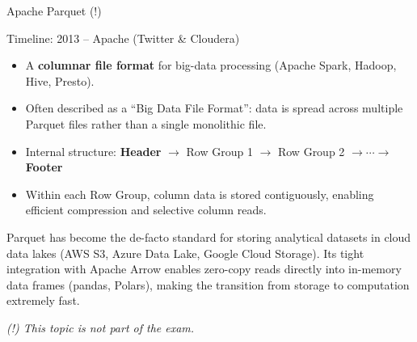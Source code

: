 \begin{frame}{Apache Parquet (!)}
  \begin{block}{Timeline: 2013 -- Apache (Twitter \& Cloudera)}
    \begin{itemize}
      \item A \textbf{columnar file format} for big-data processing
            (Apache Spark, Hadoop, Hive, Presto).
      \item Often described as a ``Big Data File Format'': data is spread
            across multiple Parquet files rather than a single monolithic file.
      \item Internal structure:
            \textbf{Header} $\rightarrow$ Row Group 1 $\rightarrow$ Row Group 2
            $\rightarrow \cdots \rightarrow$ \textbf{Footer}
      \item Within each Row Group, column data is stored contiguously,
            enabling efficient compression and selective column reads.
    \end{itemize}
  \end{block}

  Parquet has become the de-facto standard for storing analytical datasets
  in cloud data lakes (AWS S3, Azure Data Lake, Google Cloud Storage).
  Its tight integration with Apache Arrow enables zero-copy reads directly
  into in-memory data frames (pandas, Polars), making the transition from
  storage to computation extremely fast.

  \smallskip
  \textit{(!) This topic is not part of the exam.}
\end{frame}

